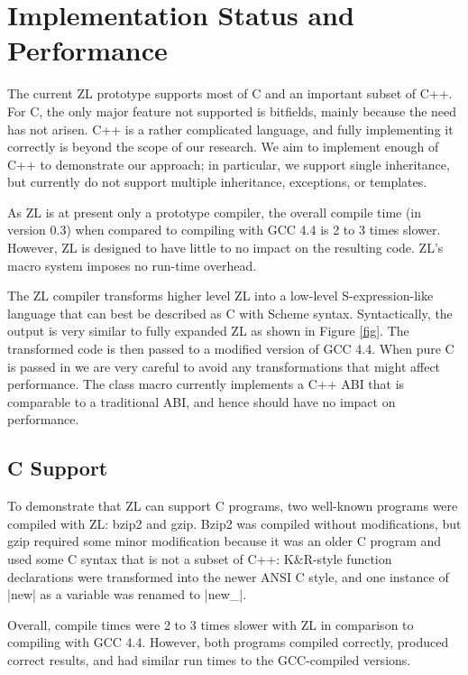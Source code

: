\chapter{Implementation Status and Performance}
\label{status}

The current ZL prototype supports most of C and an
important subset of C++.  For C, the only major feature not supported
is bitfields, mainly because the need has not arisen.  C++ is a rather
complicated language, and fully implementing it correctly is beyond
the scope of our research.  We aim to implement enough of C++ to
demonstrate our approach; in particular, we support single
inheritance, but currently do not support multiple inheritance,
exceptions, or templates.

As ZL is at present only a prototype compiler, the overall compile
time (in version 0.3) when compared to compiling with GCC 4.4
is 2 to 3 times slower.  However, ZL is designed to have little to no
impact on the resulting code.  ZL's macro system imposes no run-time
overhead.

The ZL compiler transforms higher level ZL into a low-level
S-expression-like language that can best be described as C with
Scheme syntax.  Syntactically, the output is very similar to fully
expanded ZL as shown in Figure \ref{fig}.
The transformed code is then passed to a modified version
of GCC 4.4. When pure C is passed in we are very careful to avoid any
transformations that might affect performance.  The class macro
currently implements a C++ ABI that is comparable to a traditional
ABI, and hence should have no impact on performance.

\section{C Support}

To demonstrate that ZL can support C programs, two well-known programs
were compiled with ZL: bzip2 and gzip.  Bzip2 was compiled without
modifications, but gzip required some minor modification because it was
an older C program and used some C syntax that is not a subset of C++:
K\&R-style function declarations were transformed into the newer ANSI C
style, and one instance of |new| as a variable was renamed to |new_|.

Overall, compile times were 2 to 3 times slower with ZL in comparison
to compiling with GCC 4.4.  However, both programs compiled correctly,
produced correct results, and had similar run times to the
GCC-compiled versions.

